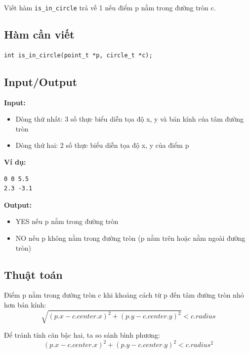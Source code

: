 \documentclass[12pt,a4paper]{article}
\begin{document}
Viết hàm \texttt{is\_in\_circle} trả về 1 nếu điểm p nằm trong đường tròn c.

\subsection{Hàm cần viết}
\begin{verbatim}
int is_in_circle(point_t *p, circle_t *c);
\end{verbatim}

\subsection{Input/Output}
\textbf{Input:}
\begin{itemize}
    \item Dòng thứ nhất: 3 số thực biểu diễn tọa độ x, y và bán kính của tâm đường tròn
    \item Dòng thứ hai: 2 số thực biểu diễn tọa độ x, y của điểm p
\end{itemize}

\textbf{Ví dụ:}
\begin{verbatim}
0 0 5.5
2.3 -3.1
\end{verbatim}

\textbf{Output:}
\begin{itemize}
    \item YES nếu p nằm trong đường tròn
    \item NO nếu p không nằm trong đường tròn (p nằm trên hoặc nằm ngoài đường tròn)
\end{itemize}

\subsection{Thuật toán}
Điểm p nằm trong đường tròn c khi khoảng cách từ p đến tâm đường tròn nhỏ hơn bán kính:
\begin{equation}
\sqrt{(p.x - c.center.x)^2 + (p.y - c.center.y)^2} < c.radius
\end{equation}

Để tránh tính căn bậc hai, ta so sánh bình phương:
\begin{equation}
(p.x - c.center.x)^2 + (p.y - c.center.y)^2 < c.radius^2
\end{equation}
\end{document}
